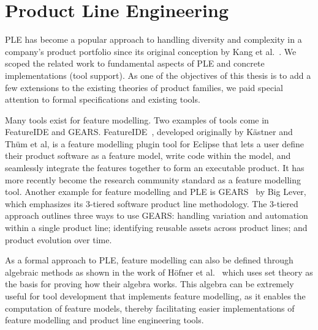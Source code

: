 



\section{Product Line Engineering}

\gls{PLE} has become a popular approach to handling diversity and complexity in a company's product portfolio since its original conception by Kang et al.~\cite{kang1990feature, kang2002feature}. We scoped the related work to fundamental aspects of \gls{PLE} and concrete implementations (tool support). As one of the objectives of this thesis is to add a few extensions to the existing theories of product families, we paid special attention to formal specifications and existing tools.

Many tools exist for feature modelling. Two examples of tools come in FeatureIDE and GEARS. FeatureIDE~\cite{kastner2009featureide, thum2014featureide}, developed originally by K\"{a}stner and Th{\"u}m et al, is a feature modelling plugin tool for Eclipse that lets a user define their product software as a feature model, write code within the model, and seamlessly integrate the features together to form an executable product. It has more recently become the research community standard as a feature modelling tool. Another example for feature modelling and PLE is GEARS~\cite{GEARS} by Big Lever, which emphasizes its 3-tiered software product line methodology. The 3-tiered approach outlines three ways to use GEARS: handling variation and automation within a single product line; identifying reusable assets across product lines; and product evolution over time. 

As a formal approach to \gls{PLE}, feature modelling can also be defined through algebraic methods as shown in the work of H\"{o}fner et al.~\cite{hofner2006feature,hofner2011algebra} which uses set theory as the basis for proving how their algebra works. This algebra can be extremely useful for tool development that implements feature modelling, as it enables the computation of feature models, thereby facilitating easier implementations of feature modelling and product line engineering tools.

